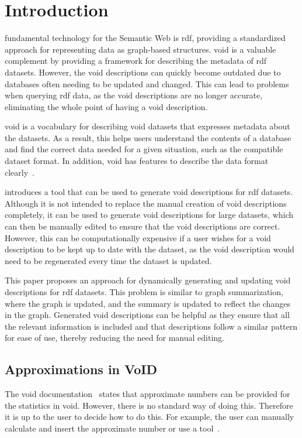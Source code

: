 \section{Introduction}\label{sec:introduction2}
 fundamental technology for the Semantic Web is \gls{rdf}, providing a standardized approach for representing data as graph-based structures. \gls{void} is a valuable complement by providing a framework for describing the metadata of \gls{rdf} datasets. However, the \gls{void} descriptions can quickly become outdated due to databases often needing to be updated and changed. This can lead to problems when querying \gls{rdf} data, as the \gls{void} descriptions are no longer accurate, eliminating the whole point of having a \gls{void} description.

\gls{void} is a vocabulary for describing \gls{void} datasets that expresses metadata about the datasets. As a result, this helps users understand the contents of a database and find the correct data needed for a given situation, such as the compatible dataset format. In addition, \gls{void} has features to describe the data format clearly~\cite{documentation-void}.

\cite{creating-void-descriptions} introduces a tool that can be used to generate \gls{void} descriptions for \gls{rdf} datasets. Although it is not intended to replace the manual creation of \gls{void} descriptions completely, it can be used to generate \gls{void} descriptions for large datasets, which can then be manually edited to ensure that the \gls{void} descriptions are correct. However, this can be computationally expensive if a user wishes for a \gls{void} description to be kept up to date with the dataset, as the \gls{void} description would need to be regenerated every time the dataset is updated.

This paper proposes an approach for dynamically generating and updating \gls{void} descriptions for \gls{rdf} datasets. This problem is similar to graph summarization, where the graph is updated, and the summary is updated to reflect the changes in the graph. Generated \gls{void} descriptions can be helpful as they ensure that all the relevant information is included and that descriptions follow a similar pattern for ease of use, thereby reducing the need for manual editing.

\subsection{Approximations in VoID} \label{sec:approximations}
The \gls{void} documentation~\cite{documentation-void} states that approximate numbers can be provided for the statistics in \gls{void}.
However, there is no standard way of doing this. Therefore it is up to the user to decide how to do this. For example, the user can manually calculate and insert the approximate number or use a tool~\cite{the-web-of-data}.

